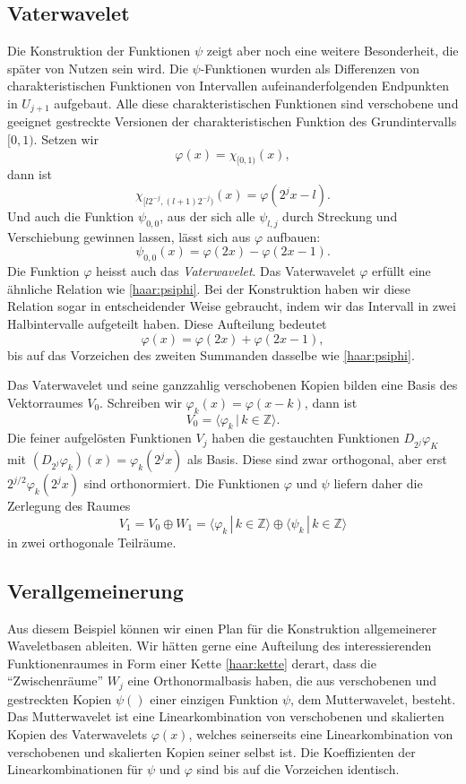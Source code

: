 \subsection{Vaterwavelet}
Die Konstruktion der Funktionen $\psi$ zeigt aber noch eine weitere 
Besonderheit, die später von Nutzen sein wird.
Die $\psi$-Funktionen wurden als Differenzen von charakteristischen
Funktionen von Intervallen aufeinanderfolgenden Endpunkten in $U_{j+1}$
aufgebaut.
Alle diese charakteristischen Funktionen sind verschobene und geeignet
gestreckte Versionen der charakteristischen Funktion des Grundintervalls
$[0,1)$.
Setzen wir
\[
\varphi(x) = \chi_{[0,1)} (x),
\]
dann ist
\[
\chi_{[l2^{-j},(l+1)2^{-j})}(x)
=
\varphi(2^jx-l).
\]
Und auch die Funktion $\psi_{0,0}$, aus der sich alle $\psi_{l,j}$ durch
Streckung und Verschiebung gewinnen lassen, lässt sich aus $\varphi$
aufbauen:
\begin{equation}
\psi_{0,0}(x) = \varphi(2x) - \varphi(2x - 1).
\label{haar:psiphi}
\end{equation}
Die Funktion $\varphi$ heisst auch das {\em Vaterwavelet}.
Das Vaterwavelet $\varphi$ erfüllt eine ähnliche Relation
wie \eqref{haar:psiphi}.
Bei der Konstruktion haben wir diese Relation sogar in entscheidender
Weise gebraucht, indem wir das Intervall in zwei Halbintervalle aufgeteilt
haben.
Diese Aufteilung bedeutet
\[
\varphi(x) = \varphi(2x) + \varphi(2x-1),
\]
bis auf das Vorzeichen des zweiten Summanden dasselbe wie 
\eqref{haar:psiphi}.

Das Vaterwavelet und seine ganzzahlig verschobenen Kopien bilden
eine Basis des Vektorraumes $V_0$.
Schreiben wir $\varphi_k(x)=\varphi(x-k)$, dann ist
\[
V_0 = \langle \varphi_k\,|\, k\in\mathbb Z\rangle.
\]
Die feiner aufgelösten Funktionen $V_j$ haben die gestauchten Funktionen
$D_{2^j}\varphi_K$ mit
$(D_{2^j}\varphi_k)(x)=\varphi_k(2^jx)$ als Basis.
Diese sind zwar orthogonal, aber erst $2^{j/2}\varphi_k(2^jx)$ sind
orthonormiert.
Die Funktionen $\varphi$ und $\psi$ liefern daher die Zerlegung
des Raumes
\[
V_1
=
V_0 \oplus W_1
=
\langle \varphi_k\,|\,k\in\mathbb Z\rangle
\oplus
\langle \psi_k\,|\,k\in\mathbb Z\rangle
\]
in zwei orthogonale Teilräume.

\subsection{Verallgemeinerung}
Aus diesem Beispiel können wir einen Plan für die Konstruktion allgemeinerer
Waveletbasen ableiten.
Wir hätten gerne eine Aufteilung des interessierenden Funktionenraumes
in Form einer Kette \eqref{haar:kette} derart, dass die ``Zwischenräume''
$W_j$ eine Orthonormalbasis haben, die aus verschobenen und gestreckten
Kopien
$\psi()$
einer einzigen Funktion $\psi$, dem Mutterwavelet, besteht.
Das Mutterwavelet ist eine Linearkombination von verschobenen
und skalierten Kopien des Vaterwavelets $\varphi(x)$, welches seinerseits
eine Linearkombination von verschobenen und skalierten Kopien seiner
selbst ist.
Die Koeffizienten der Linearkombinationen für $\psi$ und $\varphi$ sind
bis auf die Vorzeichen identisch.




